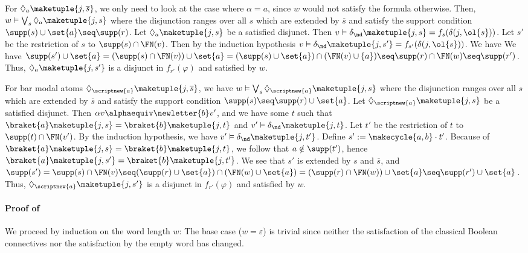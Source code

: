 \documentclass[10pt, final, conference, a4paper, twocolumn]{IEEEtran}
\begin{document}
  For $\Diamond_a \maketuple{j, \overline{s}}$,
  we only need to look at the case where $\alpha = a$, since $w$ would not satisfy the formula otherwise. 
  Then, $w \vDash \bigvee_s \Diamond_a \maketuple{j, s}$ where the disjunction ranges over all $s$ which are extended
  by $\overline{s}$ and satisfy the support condition $\supp(s) \cup \set{a} \seq \supp(r)$.
  Let $\Diamond_a \maketuple{j, s}$ be a satisfied disjunct. Then $v \vDash \delta_{\nd}\maketuple{j, s}=f_{s}(\delta(j,\ol{s}))$.
  Let $s'$ be the restriction of $s$ to $\supp(s) \cap \FN(v)$. Then by the induction hypothesis $v \vDash \delta_{\nd}\maketuple{j, s'}=f_{s'}(\delta(j,\ol{s}))$. We have
  We have $\supp(s') \cup \set{a} = (\supp(s)\cap \FN(v))\cup  \set{a} = (\supp(s)\cup \set{a})\cap (\FN(v)\cup \{a\})\seq \supp(r)\cap \FN(w)\seq \supp(r')$. Thus, $\Diamond_a \maketuple{j, s'}$ is a disjunct in $f_{r'}(\varphi)$ and satisfied by $w$.
  
  For bar modal atoms $\Diamond_{\scriptnew{a}} \maketuple{j, \overline{s}}$, we have $w \vDash \bigvee_s
  \Diamond_{\scriptnew{a}} \maketuple{j, s}$ where the disjunction ranges over all $s$ which are extended by $\overline{s}$
  and satisfy the support condition $\supp(s) \seq \supp(r) \cup \set{a}$. Let $\Diamond_{\scriptnew{a}} \maketuple{j, s}$
  be a satisfied disjunct.
  Then $\alpha v \alphaequiv \newletter{b} v'$, and we have some $t$ such that $\braket{a}\maketuple{j, s} =
  \braket{b}\maketuple{j, t}$ and $v' \vDash \delta_{\nd}\maketuple{j, t}$.
  Let $t'$ be the restriction of $t$ to $\supp(t) \cap \FN(v')$.
  By the induction hypothesis, we have $v' \vDash \delta_{\nd}\maketuple{j, t'}$.
  Define $s' := \makecycle{a,b} \cdot t'$. Because of $\braket{a}\maketuple{j, s} = \braket{b}\maketuple{j, t}$,
  we follow that $a \notin \supp(t')$, hence $\braket{a}\maketuple{j, s'} = \braket{b}\maketuple{j, t'}$.
  We see that $s'$ is extended by $s$ and $\overline{s}$, and $\supp(s') = \supp(s) \cap \FN(v)
 \seq (\supp(r)\cup \set{a})\cap (\FN(w)\cup \set{a}) = (\supp(r)\cap \FN(w))\cup \set{a} \seq \supp(r') \cup \set{a}$. Thus, $\Diamond_{\scriptnew{a}} \maketuple{j, s'}$ is a
  disjunct in $f_{r'}(\varphi)$ and satisfied by $w$.

\paragraph*{Proof of~}

  We proceed by induction on the word length $w$: The base case ($w = \varepsilon$) is trivial
  since neither the satisfaction of the classical Boolean connectives nor the satisfaction by the
  empty word has changed.
\end{document}
